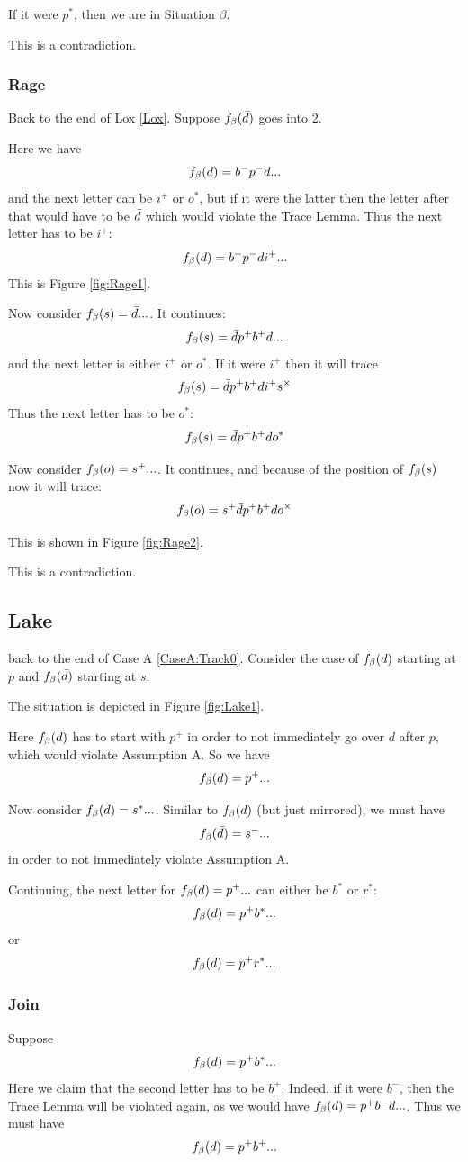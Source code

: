 If it were $p^*$, then we are in Situation $\beta$.

This is a contradiction.

\subsubsection{Rage}\label{Rage}
Back to the end of Lox \ref{Lox}. Suppose $f_\beta(\bar{d})$ goes into 2.

Here we have
\[
f_\beta(d) = b^- p^- d...
\]
and the next letter can be $i^+$ or $o^*$, but if it were the latter then the letter after that would have to be $\bar{d}$ which would violate the Trace Lemma. Thus the next letter has to be $i^+$:
\[
f_\beta(d) = b^- p^- d i^+...
\]
This is Figure \ref{fig:Rage1}.

Now consider $f_\beta(s) = \bar{d}...$. It continues:
\[
f_\beta(s) = \bar{d} p^+ b^+ d...
\]
and the next letter is either $i^+$ or $o^*$. If it were $i^+$ then it will trace
\[
f_\beta(s) = \bar{d} p^+ b^+ d i^+ s^\times
\]
Thus the next letter has to be $o^*$:
\[
f_\beta(s) = \bar{d} p^+ b^+ d o^*
\]

Now consider $f_\beta(o) = s^+...$. It continues, and because of the position of $f_\beta(s)$ now it will trace:
\[
f_\beta(o) = s^+ \bar{d} p^+ b^+ d o^\times
\]

This is shown in Figure \ref{fig:Rage2}.

This is a contradiction.

\subsection{Lake}\label{Lake}
back to the end of Case A \ref{CaseA:Track0}. Consider the case of $f_\beta(d)$ starting at $p$ and $f_\beta(\bar{d})$ starting at $s$.

The situation is depicted in Figure \ref{fig:Lake1}.

Here $f_\beta(d)$ has to start with $p^+$ in order to not immediately go over $d$ after $p$, which would violate Assumption A. So we have
\[
f_\beta(d) = p^+...
\]

Now consider $f_\beta(\bar{d}) = s^*...$. Similar to $f_\beta(d)$ (but just mirrored), we must have
\[
f_\beta(\bar{d}) = s^-...
\]
in order to not immediately violate Assumption A.

Continuing, the next letter for $f_\beta(d) = p^+...$ can either be $b^*$ or $r^*$:
\[
f_\beta(d) = p^+ b^*...
\]
or
\[
f_\beta(d) = p^+ r^*...
\]

\subsubsection{Join} \label{Join}
Suppose
\[
f_\beta(d) = p^+ b^*...
\]
Here we claim that the second letter has to be $b^+$. Indeed, if it were $b^-$, then the Trace Lemma will be violated again, as we would have $f_\beta(d) = p^+ b^- d...$. Thus we must have
\[
f_\beta(d) = p^+ b^+...
\]

